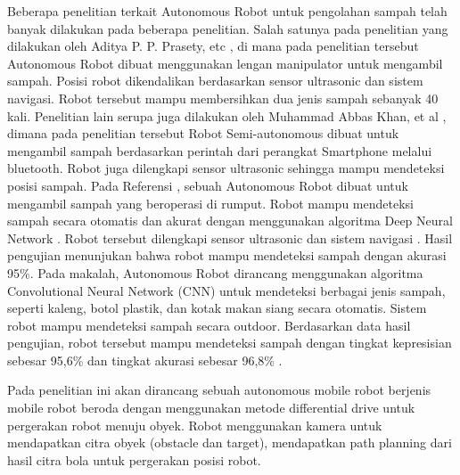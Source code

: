  Beberapa penelitian terkait Autonomous Robot untuk pengolahan sampah telah banyak dilakukan pada beberapa penelitian. Salah satunya pada penelitian yang dilakukan oleh Aditya P. P. Prasety, etc \cite{Prasetyo2020}, di mana pada penelitian tersebut Autonomous Robot dibuat menggunakan lengan manipulator untuk mengambil sampah. Posisi robot dikendalikan berdasarkan sensor ultrasonic dan sistem navigasi. Robot tersebut mampu membersihkan dua jenis sampah sebanyak 40 kali. Penelitian lain serupa juga dilakukan oleh Muhammad Abbas Khan, et al \cite{Khan2020}, dimana pada penelitian tersebut Robot Semi-autonomous dibuat untuk mengambil sampah berdasarkan perintah dari perangkat Smartphone melalui bluetooth. Robot juga dilengkapi sensor ultrasonic sehingga mampu mendeteksi posisi sampah. Pada Referensi \cite{Bai2018}, sebuah Autonomous Robot dibuat untuk mengambil sampah yang beroperasi di rumput. Robot mampu mendeteksi sampah secara otomatis dan akurat dengan menggunakan algoritma Deep Neural Network \cite{Kong2009}. Robot tersebut dilengkapi sensor ultrasonic\cite{Michael2008} dan sistem navigasi \cite{Wang2008}. Hasil pengujian menunjukan bahwa robot mampu mendeteksi sampah dengan akurasi 95\%. Pada makalah\cite{Arai2019}, Autonomous Robot dirancang menggunakan algoritma Convolutional Neural Network (CNN) untuk mendeteksi berbagai jenis sampah, seperti kaleng, botol plastik, dan kotak makan siang secara otomatis. Sistem robot mampu mendeteksi sampah secara outdoor. Berdasarkan data hasil pengujian\cite{Arai2019}, robot tersebut mampu mendeteksi sampah dengan tingkat kepresisian sebesar 95,6\% dan tingkat akurasi sebesar 96,8\% .


Pada penelitian ini akan dirancang sebuah autonomous mobile robot berjenis mobile robot beroda dengan menggunakan metode differential drive untuk pergerakan robot menuju obyek. Robot menggunakan kamera untuk mendapatkan citra  obyek (obstacle dan target), mendapatkan path planning dari hasil citra bola untuk pergerakan posisi robot.

